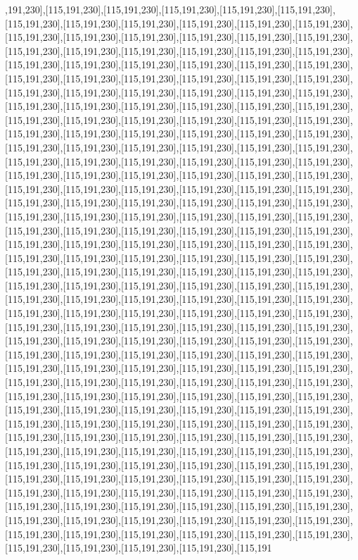 ,191,230],[115,191,230],[115,191,230],[115,191,230],[115,191,230],[115,191,230],[115,191,230],[115,191,230],[115,191,230],[115,191,230],[115,191,230],[115,191,230],[115,191,230],[115,191,230],[115,191,230],[115,191,230],[115,191,230],[115,191,230],[115,191,230],[115,191,230],[115,191,230],[115,191,230],[115,191,230],[115,191,230],[115,191,230],[115,191,230],[115,191,230],[115,191,230],[115,191,230],[115,191,230],[115,191,230],[115,191,230],[115,191,230],[115,191,230],[115,191,230],[115,191,230],[115,191,230],[115,191,230],[115,191,230],[115,191,230],[115,191,230],[115,191,230],[115,191,230],[115,191,230],[115,191,230],[115,191,230],[115,191,230],[115,191,230],[115,191,230],[115,191,230],[115,191,230],[115,191,230],[115,191,230],[115,191,230],[115,191,230],[115,191,230],[115,191,230],[115,191,230],[115,191,230],[115,191,230],[115,191,230],[115,191,230],[115,191,230],[115,191,230],[115,191,230],[115,191,230],[115,191,230],[115,191,230],[115,191,230],[115,191,230],[115,191,230],[115,191,230],[115,191,230],[115,191,230],[115,191,230],[115,191,230],[115,191,230],[115,191,230],[115,191,230],[115,191,230],[115,191,230],[115,191,230],[115,191,230],[115,191,230],[115,191,230],[115,191,230],[115,191,230],[115,191,230],[115,191,230],[115,191,230],[115,191,230],[115,191,230],[115,191,230],[115,191,230],[115,191,230],[115,191,230],[115,191,230],[115,191,230],[115,191,230],[115,191,230],[115,191,230],[115,191,230],[115,191,230],[115,191,230],[115,191,230],[115,191,230],[115,191,230],[115,191,230],[115,191,230],[115,191,230],[115,191,230],[115,191,230],[115,191,230],[115,191,230],[115,191,230],[115,191,230],[115,191,230],[115,191,230],[115,191,230],[115,191,230],[115,191,230],[115,191,230],[115,191,230],[115,191,230],[115,191,230],[115,191,230],[115,191,230],[115,191,230],[115,191,230],[115,191,230],[115,191,230],[115,191,230],[115,191,230],[115,191,230],[115,191,230],[115,191,230],[115,191,230],[115,191,230],[115,191,230],[115,191,230],[115,191,230],[115,191,230],[115,191,230],[115,191,230],[115,191,230],[115,191,230],[115,191,230],[115,191,230],[115,191,230],[115,191,230],[115,191,230],[115,191,230],[115,191,230],[115,191,230],[115,191,230],[115,191,230],[115,191,230],[115,191,230],[115,191,230],[115,191,230],[115,191,230],[115,191,230],[115,191,230],[115,191,230],[115,191,230],[115,191,230],[115,191,230],[115,191,230],[115,191,230],[115,191,230],[115,191,230],[115,191,230],[115,191,230],[115,191,230],[115,191,230],[115,191,230],[115,191,230],[115,191,230],[115,191,230],[115,191,230],[115,191,230],[115,191,230],[115,191,230],[115,191,230],[115,191,230],[115,191,230],[115,191,230],[115,191,230],[115,191,230],[115,191,230],[115,191,230],[115,191,230],[115,191,230],[115,191,230],[115,191,230],[115,191,230],[115,191,230],[115,191,230],[115,191,230],[115,191,230],[115,191,230],[115,191,230],[115,191,230],[115,191,230],[115,191,230],[115,191,230],[115,191,230],[115,191,230],[115,191,230],[115,191,230],[115,191,230],[115,191,230],[115,191,230],[115,191,230],[115,191,230],[115,191,230],[115,191,230],[115,191,230],[115,191,230],[115,191,230],[115,191,230],[115,191,230],[115,191,230],[115,191,230],[115,191,230],[115,191,230],[115,191,230],[115,191,230],[115,191,230],[115,191,230],[115,191,230],[115,191,230],[115,191,230],[115,191,230],[115,191,230],[115,191,230],[115,191,230],[115,191,230],[115,191